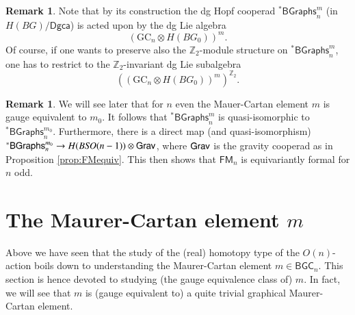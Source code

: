 \documentclass[a4paper]{amsart}
\theoremstyle{plain}
\newtheorem{cor}[thm]{Corollary}
\theoremstyle{definition}
\newtheorem{rem}[thm]{Remark}
\newcommand{\alg}[1]{\mathfrak{{#1}}}
\newcommand{\Z}{{\mathbb{Z}}}
\newcommand{\Graphs}{{\mathsf{Graphs}}}
\newcommand{\FM}{\mathsf{FM}}
\newcommand{\La}{\Lambda}
\newcommand{\GC}{\mathrm{GC}}
\newcommand{\BGC}{\mathsf{BGC}}
\newcommand{\BstG}{{}^*\mathsf{BGraphs}}
\newcommand{\stG}{{}^*\Graphs}
\newcommand{\SO}{\mathit{SO}}
\newcommand{\dgca}{\mathsf{Dgca}}
\begin{document}
\begin{rem}
Note that by its construction the dg Hopf cooperad $\BstG_n^m$ (in $H(BG)/\dgca$) is acted upon by the dg Lie algebra
\[
(\GC_n\otimes H(BG_0))^m.
\]
Of course, if one wants to preserve also the $\Z_2$-module structure on $\BstG_n^m$, one has to restrict to the $\Z_2$-invariant dg Lie subalgebra 
\[
\left( (\GC_n\otimes H(BG_0))^m \right)^{\Z_2}.
\]
\end{rem}

\begin{rem}
 We will see later that for $n$ even the Mauer-Cartan element $m$ is gauge equivalent to $m_0$. It follows that $\BstG_n^m$ is quasi-isomorphic to $\BstG_n^{m_0}$.
Furthermore, there is a direct map (and quasi-isomorphism) $\BstG_n^{m_0}\to H(B\SO(n-1))\otimes \Grav$, where $\mathsf{Grav}$ is the gravity cooperad as in Proposition \ref{prop:FMequiv}.
This then shows that $\FM_n$ is equivariantly formal for $n$ odd.
\end{rem}




\section{The Maurer-Cartan element \texorpdfstring{$m$}{m}}\label{sec:MC}
Above we have seen that the study of the (real) homotopy type of the $O(n)$-action boils down to understanding the Maurer-Cartan element $m\in \BGC_n$. This section is hence devoted to studying (the gauge equivalence class of) $m$. 
In fact, we will see that $m$ is (gauge equivalent to) a quite trivial graphical Maurer-Cartan element.
\end{document}
